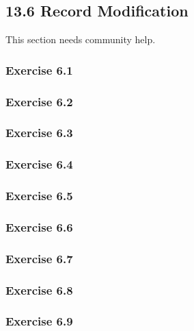 \documentclass[../../main.tex]{subfiles}
\begin{document}
\subsection{13.6 Record Modification}

This section needs community help.

\subsubsection*{Exercise 6.1}

\subsubsection*{Exercise 6.2}

\subsubsection*{Exercise 6.3}

\subsubsection*{Exercise 6.4}

\subsubsection*{Exercise 6.5}

\subsubsection*{Exercise 6.6}

\subsubsection*{Exercise 6.7}

\subsubsection*{Exercise 6.8}

\subsubsection*{Exercise 6.9}
\end{document}
